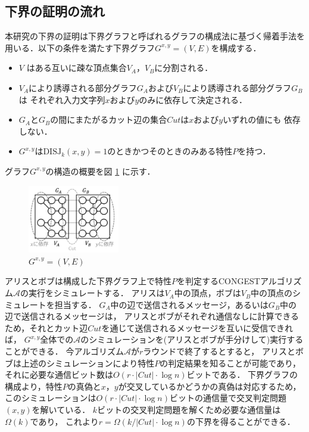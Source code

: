 \documentclass[a4j,twoside]{jarticle}
\newcommand{\CONGEST}{\textsf{CONGEST}}
\theoremstyle{definition}
\begin{document}
\begin{論文概要}
\section{下界の証明の流れ}
本研究の下界の証明は下界グラフと呼ばれるグラフの構成法に基づく帰着手法を用いる．以下の条件を満たす下界グラフ$G^{x,y}=(V, E)$を構成する．
\begin{itemize}
\item $V$ はある互いに疎な頂点集合$V_A$，$V_B$に分割される．
\item $V_A$により誘導される部分グラフ$G_A$および$V_B$により誘導される部分グラフ$G_B$は
それぞれ入力文字列$x$および$y$のみに依存して決定される．
\item $G_A$と$G_B$の間にまたがるカット辺の集合$\mathit{Cut}$は$x$および$y$いずれの値にも
依存しない．
\item $G^{x,y}$は$\mathrm{DISJ}_{k} (x, y)=1$のときかつそのときのみある特性$P$を持つ．
\end{itemize}
グラフ$G^{x, y}$の構造の概要を図 \ref{Gxy} に示す．
\begin{figure}[ht]
\begin{center}
\includegraphics[width=40mm]{Gxy.png}
\end{center}
\caption{$G^{x, y} = (V, E)$}
\label{Gxy}
\end{figure}

アリスとボブは構成した下界グラフ上で特性$P$を判定する{\CONGEST}アルゴリズム$\mathcal{A}$の実行をシミュレートする．
アリスは$V_{A}$中の頂点，ボブは$V_{B}$中の頂点のシミュレートを担当する．
$G_{A}$中の辺で送信されるメッセージ，あるいは$G_{B}$中の辺で送信されるメッセージは，
アリスとボブがそれぞれ通信なしに計算できるため，それとカット辺$\mathit{Cut}$を通じて送信されるメッセージを互いに受信できれば，
$G^{x,y}$全体での$\mathcal{A}$のシミュレーションを(アリスとボブが手分けして)実行することができる．
今アルゴリズム$\mathcal{A}$が$r$ラウンドで終了するとすると，
アリスとボブは上述のシミュレーションにより特性$P$の判定結果を知ることが可能であり，
それに必要な通信ビット数は$O(r \cdot |\mathit{Cut}| \cdot \log n)$ビットである．
下界グラフの構成より，特性$P$の真偽と$x$，$y$が交叉しているかどうかの真偽は対応するため，
このシミュレーションは$O(r \cdot |\mathit{Cut}| \cdot \log n)$ビットの通信量で交叉判定問題$(x,y)$を解いている．
$k$ビットの交叉判定問題を解くため必要な通信量は$\Omega(k)$であり，
これより$r = \Omega (k / |\mathit{Cut}| \cdot \log n)$の下界を得ることができる．


\end{論文概要}
\end{document}
